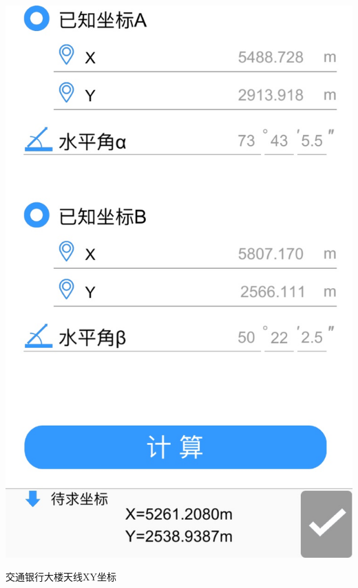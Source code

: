 \documentclass[a4paper,16pt,UTF8]{article}
\begin{document}
\begin{center}
    \includegraphics[scale = 0.45]{jcts.jpg}
    
    交通银行大楼天线XY坐标
    

\end{center}
\end{document}
